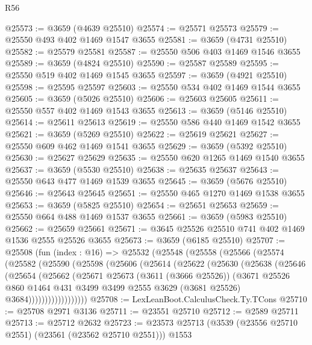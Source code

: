 \begin{lexlean}{R56}
\begin{coremodule}
@25573 := @3659 (@4639 @25510)
@25574 := @25571 @25573
@25579 := @25550 @493 @402 @1469 @1547 @3655
@25581 := @3659 (@4731 @25510)
@25582 := @25579 @25581
@25587 := @25550 @506 @403 @1469 @1546 @3655
@25589 := @3659 (@4824 @25510)
@25590 := @25587 @25589
@25595 := @25550 @519 @402 @1469 @1545 @3655
@25597 := @3659 (@4921 @25510)
@25598 := @25595 @25597
@25603 := @25550 @534 @402 @1469 @1544 @3655
@25605 := @3659 (@5026 @25510)
@25606 := @25603 @25605
@25611 := @25550 @557 @402 @1469 @1543 @3655
@25613 := @3659 (@5146 @25510)
@25614 := @25611 @25613
@25619 := @25550 @586 @440 @1469 @1542 @3655
@25621 := @3659 (@5269 @25510)
@25622 := @25619 @25621
@25627 := @25550 @609 @462 @1469 @1541 @3655
@25629 := @3659 (@5392 @25510)
@25630 := @25627 @25629
@25635 := @25550 @620 @1265 @1469 @1540 @3655
@25637 := @3659 (@5530 @25510)
@25638 := @25635 @25637
@25643 := @25550 @643 @477 @1469 @1539 @3655
@25645 := @3659 (@5676 @25510)
@25646 := @25643 @25645
@25651 := @25550 @465 @1270 @1469 @1538 @3655
@25653 := @3659 (@5825 @25510)
@25654 := @25651 @25653
@25659 := @25550 @664 @488 @1469 @1537 @3655
@25661 := @3659 (@5983 @25510)
@25662 := @25659 @25661
@25671 := @3645 @25526 @25510 @741 @402 @1469 @1536 @2555 @25526 @3655
@25673 := @3659 (@6185 @25510)
@25707 := @25508
    (fun (index : @16) =>
    @25532
      (@25548
        (@25558
          (@25566
            (@25574
              (@25582
                (@25590
                  (@25598
                    (@25606
                      (@25614
                        (@25622
                          (@25630
                            (@25638
                              (@25646
                                (@25654
                                  (@25662
                                    (@25671
                                      @25673
                                      (@3611 (@3666 @25526))
                                      (@3671
                                        @25526
                                        @860
                                        @1464
                                        @431
                                        @3499
                                        @3499
                                        @2555
                                        @3629
                                        (@3681 @25526)
                                        @3684))))))))))))))))))
@25708 := LexLeanBoot.CalculusCheck.Ty.TCons
@25710 := @25708 @2971 @3136
@25711 := @23551 @25710
@25712 := @2589 @25711
@25713 := @25712 @2632
@25723 := @23573 @25713 (@3539 (@23556 @25710 @2551) (@23561 (@23562 @25710 @2551))) @1553

\end{coremodule}
\end{lexlean}
